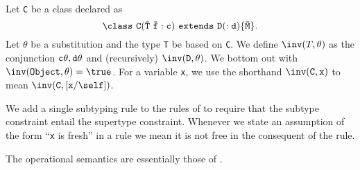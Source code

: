 Let {\tt C} be a class declared as
$${\tt \class\ C(\bar{\tt T}\ \bar{\tt f}:c)\ extends\
D(:d)\{\bar{\tt M}\}}.$$
Let
$\theta$ be a substitution and the type {\tt T} be based on {\tt C}.
We define $\inv(T,\theta)$
as the conjunction ${\tt c\theta,d\theta}$ and (recursively)
$\inv({\tt D},\theta)$.  We bottom out with $\inv({\tt
Object},\theta)=\true$. For a variable {\tt x}, we use the shorthand
$\inv({\tt C},{\tt x})$ to mean $\inv({\tt C},[{\tt x}/\self])$.

We add a single subtyping rule to the rules of \FJ{} to require
that the subtype constraint entail the supertype constraint.
Whenever we state an assumption of the form ``{\tt x} is
fresh'' in a rule we mean it is not free in the consequent of the
rule.

The operational semantics are essentially those of \FJ{}.

